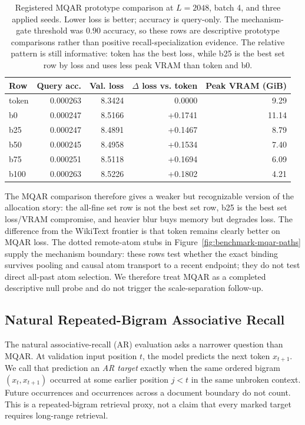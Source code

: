 \documentclass{article}
\theoremstyle{plain}
\theoremstyle{definition}
\theoremstyle{remark}
\begin{document}
\begin{table}[t]
\centering
\caption{Registered MQAR prototype comparison at $L=2048$, batch 4, and three
applied seeds.  Lower loss is better; accuracy is query-only.  The
mechanism-gate threshold was $0.90$ accuracy, so these rows are
descriptive prototype comparisons rather than positive recall-specialization
evidence.  The relative pattern is still informative: token has the best loss,
while b25 is the best set row by loss and uses less peak VRAM than token and
b0.}
\label{tab:mqar-prototype-comparison}
\begin{tabular}{lrrrr}
\toprule
Row & Query acc. & Val. loss & $\Delta$ loss vs. token & Peak VRAM (GiB) \\
\midrule
token & 0.000263 & 8.3424 & 0.0000 & 9.29 \\
b0 & 0.000247 & 8.5166 & +0.1741 & 11.14 \\
b25 & 0.000247 & 8.4891 & +0.1467 & 8.79 \\
b50 & 0.000245 & 8.4958 & +0.1534 & 7.40 \\
b75 & 0.000251 & 8.5118 & +0.1694 & 6.09 \\
b100 & 0.000263 & 8.5226 & +0.1802 & 4.21 \\
\bottomrule
\end{tabular}
\end{table}

The MQAR comparison therefore gives a weaker but recognizable version of the
allocation story: the all-fine set row is not the best set row, b25 is the best
set loss/VRAM compromise, and heavier blur buys memory but degrades loss.  The
difference from the WikiText frontier is that token remains clearly better on
MQAR loss.  The dotted remote-atom stubs in
Figure~\ref{fig:benchmark-mqar-paths} supply the mechanism boundary: these
rows test whether the exact binding survives pooling and causal atom transport
to a recent endpoint; they do not test direct all-past atom selection.  We
therefore treat MQAR as a completed descriptive null probe and
do not trigger the scale-separation follow-up.

\subsection{Natural Repeated-Bigram Associative Recall}
\label{sec:results-natural-ar}

The natural associative-recall (AR) evaluation asks a narrower question than
MQAR.  At validation input position $t$, the model predicts the next token
$x_{t+1}$.  We call that prediction an \emph{AR target} exactly when the same
ordered bigram $(x_t,x_{t+1})$ occurred at some earlier position $j<t$ in the
same unbroken context.  Future occurrences and occurrences across a document
boundary do not count.  This is a repeated-bigram retrieval proxy, not a claim
that every marked target requires long-range retrieval.
\end{document}
